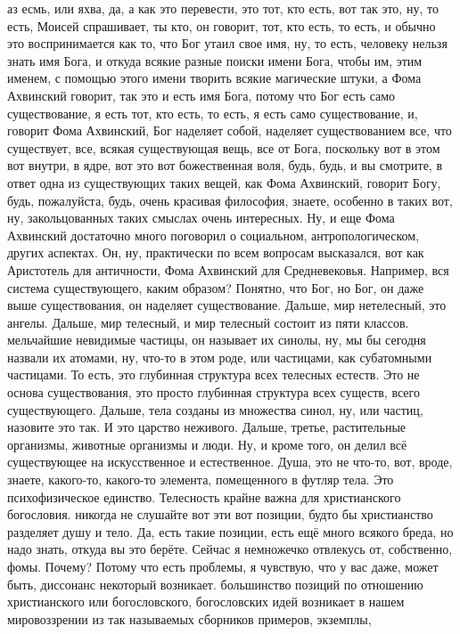 аз есмь, или яхва, да, а как это перевести, это тот, кто есть, вот так это, ну,
то есть, Моисей спрашивает, ты кто, он говорит, тот, кто есть, то есть, и обычно
это воспринимается как то, что Бог утаил свое имя, ну, то есть, человеку нельзя
знать имя Бога, и откуда всякие разные поиски имени Бога, чтобы им, этим именем,
с помощью этого имени творить всякие магические штуки, а Фома Ахвинский говорит,
так это и есть имя Бога, потому что Бог есть само существование, я есть тот, кто
есть, то есть, я есть само существование, и, говорит Фома Ахвинский, Бог
наделяет собой, наделяет существованием все, что существует, все, всякая
существующая вещь, все от Бога, поскольку вот в этом вот внутри, в ядре, вот это
вот божественная воля, будь, будь, и вы смотрите, в ответ одна из существующих
таких вещей, как Фома Ахвинский, говорит Богу, будь, пожалуйста, будь, очень
красивая философия, знаете, особенно в таких вот, ну, закольцованных таких
смыслах очень интересных. Ну, и еще Фома Ахвинский достаточно много поговорил о
социальном, антропологическом, других аспектах. Он, ну, практически по всем
вопросам высказался, вот как Аристотель для античности, Фома Ахвинский для
Средневековья. Например, вся система существующего, каким образом? Понятно, что
Бог, но Бог, он даже выше существования, он наделяет существование. Дальше, мир
нетелесный, это ангелы. Дальше, мир телесный, и мир телесный состоит из пяти
классов. мельчайшие невидимые частицы, он называет их синолы, ну, мы бы сегодня
назвали их атомами, ну, что-то в этом роде, или частицами, как субатомными
частицами. То есть, это глубинная структура всех телесных естеств. Это не основа
существования, это просто глубинная структура всех существ, всего существующего.
Дальше, тела созданы из множества синол, ну, или частиц, назовите это так. И это
царство неживого. Дальше, третье, растительные организмы, животные организмы и
люди. Ну, и кроме того, он делил всё существующее на искусственное и
естественное. Душа, это не что-то, вот, вроде, знаете, какого-то, какого-то
элемента, помещенного в футляр тела. Это психофизическое единство. Телесность
крайне важна для христианского богословия. никогда не слушайте вот эти вот
позиции, будто бы христианство разделяет душу и тело. Да, есть такие позиции,
есть ещё много всякого бреда, но надо знать, откуда вы это берёте. Сейчас я
немножечко отвлекусь от, собственно, фомы. Почему? Потому что есть проблемы, я
чувствую, что у вас даже, может быть, диссонанс некоторый возникает. большинство
позиций по отношению христианского или богословского, богословских идей
возникает в нашем мировоззрении из так называемых сборников примеров, экземплы,
